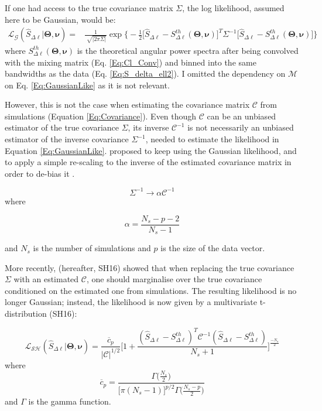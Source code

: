 \qquad If one had access to the true covariance matrix $\Sigma$, the log likelihood, assumed here to be Gaussian, would be:
\begin{align}
\mathcal{L_G}(\hat{S}_{\Delta\ell}|\pmb{\Theta}, \pmb{\nu}) = & \frac{1}{\sqrt[]{\vert 2\pi \Sigma \vert}} \exp\bigg\{ - \frac{1}{2} \big[ \hat{S}_{\Delta\ell} - S^{th}_{\Delta\ell}(\pmb{\Theta}, \pmb{\nu})\big]^T \Sigma^{-1} \big[ \hat{S}_{\Delta\ell} - S^{th}_{\Delta\ell}(\pmb{\Theta}, \pmb{\nu})\big]\bigg\}
\label{Eq:GaussianLike}
\end{align}
where $S^{th}_{\Delta\ell}(\pmb{\Theta}, \pmb{\nu})$ is the theoretical angular power spectra after being convolved with the mixing matrix (Eq. \eqref{Eq:Cl_Conv}) and binned into the same bandwidths as the data (Eq. \eqref{Eq:S_delta_ell2}). I omitted the  dependency on $\mathcal{M}$ on Eq. \eqref{Eq:GaussianLike} as it is not relevant.

\qquad However, this is not the case when estimating the covariance matrix $\mathcal{C}$ from simulations (Equation \ref{Eq:Covariance}). Even though $\mathcal{C}$ can be an unbiased estimator of the true covariance $\Sigma$, its inverse $\mathcal{C}^{-1}$ is not necessarily an unbiased estimator of the inverse covariance $\Sigma^{-1}$, needed to estimate the likelihood in Equation \eqref{Eq:GaussianLike}. \cite{Hartlap2007} proposed to keep using the Gaussian likelihood, and to apply a simple re-scaling to the inverse of the estimated covariance matrix in order to de-bias it \citep{AndersonBook}.

\begin{equation}
\Sigma^{-1} \rightarrow \alpha \mathcal{C}^{-1}
\end{equation}
where 

\begin{equation}
\alpha = \frac{N_s - p - 2}{N_s - 1}
\end{equation}

and $N_s$ is the number of simulations and $p$ is the size of the data vector. 

\qquad More recently, \cite{2016SellentinHeavens} (hereafter, SH16) showed that when replacing the true covariance $\Sigma$ with an estimated $\mathcal{C}$, one should marginalise over the true covariance conditioned on the estimated one from simulations.  The resulting likelihood is no longer Gaussian; instead, the likelihood is now given by a multivariate t-distribution (SH16):

\begin{equation}
\mathcal{L_{SH}}(\hat{S}_{\Delta\ell}|\pmb{\Theta}, \pmb{\nu}) = \frac{\overline{c}_p}{\vert \mathcal{C} \vert^{1/2}} \Big[1 + \frac{(\hat{S}_{\Delta\ell} - S^{th}_{\Delta\ell})^T \mathcal{C}^{-1} (\hat{S}_{\Delta\ell} - S^{th}_{\Delta\ell})}{N_s + 1}\Big]^{\frac{-N_s}{2}}
\end{equation}
where
\begin{equation}
\overline{c}_p = \frac{\Gamma\big(\frac{N_s}{2}\big)}{\big[\pi(N_s - 1)\big]^{p/2} \Gamma\big(\frac{N_s - p}{2}\big)}
\end{equation}
and $\Gamma$ is the gamma function.


